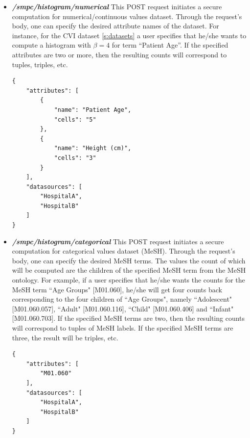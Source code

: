 \begin{itemize}
\item \textbf{\textit{/smpc/histogram/numerical}}
This POST request initiates a secure computation for numerical/continuous values dataset.
Through the request's body, one can specify the desired attribute names of the dataset.
For instance, for the CVI dataset \ref{s:datasets} a user specifies that he/she wants to compute a histogram with $\beta = 4$ for term ``Patient Age''.
If the specified attributes are two or more, then the resulting counts will correspond to tuples, triples, etc.

{
\begin{verbatim}
{
    "attributes": [
        {
            "name": "Patient Age",
            "cells": "5"
        },
        {
            "name": "Height (cm)",
            "cells": "3"
        }
    ],
    "datasources": [
        "HospitalA",
        "HospitalB"
    ]
}
\end{verbatim}
\label{sc:histogram-numerical-post}
}



\item \textbf{\textit{/smpc/histogram/categorical}}
This POST request initiates a secure computation for categorical values dataset (MeSH).
Through the request's body, one can specify the desired MeSH terms.
The values the count of which will be computed are the children of the specified MeSH term from the MeSH ontology.
For example, if a user specifies that he/she wants the counts for the MeSH term ``Age Groups" [M01.060], he/she will get four counts back corresponding to the four children of ``Age Groups", namely ``Adolescent" [M01.060.057], ``Adult" [M01.060.116], ``Child" [M01.060.406] and ``Infant" [M01.060.703].
If the specified MeSH terms are two, then the resulting counts will correspond to tuples of MeSH labels.
If the specified MeSH terms are three, the result will be triples, etc.

{
\begin{verbatim}
{
    "attributes": [
        "M01.060"
    ],
    "datasources": [
        "HospitalA",
        "HospitalB"
    ]
}
\end{verbatim}
\label{sc:histogram-categorical-post}
}




\end{itemize}
